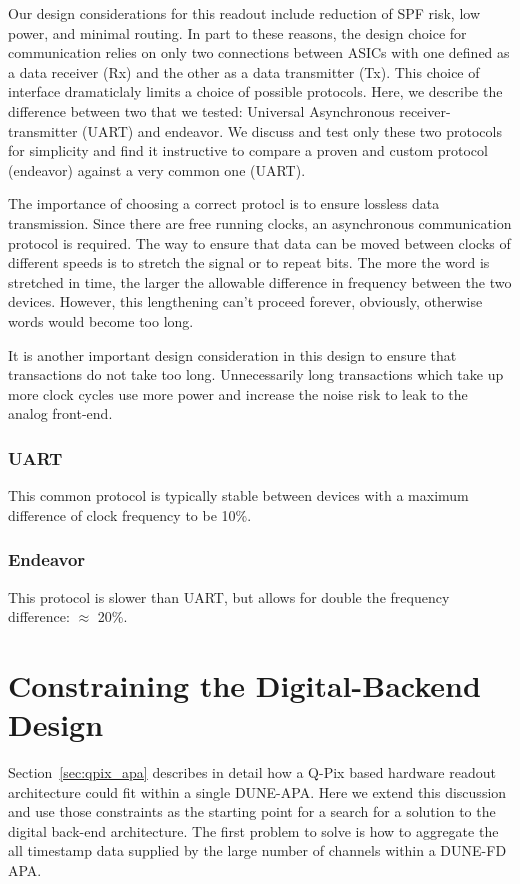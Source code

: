 Our design considerations for this readout include reduction of SPF risk, low power, and minimal routing.
In part to these reasons, the design choice for communication relies on only two connections between ASICs with one defined as a data receiver (Rx) and the other as a data transmitter (Tx).
This choice of interface dramaticlaly limits a choice of possible protocols.
Here, we describe the difference between two that we tested: Universal Asynchronous receiver-transmitter (UART) and endeavor.
We discuss and test only these two protocols for simplicity and find it instructive to compare a proven and custom protocol (endeavor) against a very common one (UART).

The importance of choosing a correct protocl is to ensure lossless data transmission.
Since there are free running clocks, an asynchronous communication protocol is required.
The way to ensure that data can be moved between clocks of different speeds is to stretch the signal or to repeat bits.
The more the word is stretched in time, the larger the allowable difference in frequency between the two devices.
However, this lengthening can't proceed forever, obviously, otherwise words would become too long.

It is another important design consideration in this design to ensure that transactions do not take too long.
Unnecessarily long transactions which take up more clock cycles use more power and increase the noise risk to leak to the analog front-end.


\subsubsection{UART}
This common protocol is typically stable between devices with a maximum difference of clock frequency to be 10\%.

\subsubsection{Endeavor}
This protocol is slower than UART, but allows for double the frequency difference: $\approx$ 20\%.

\section{Constraining the Digital-Backend Design}

Section~\ref{sec:qpix_apa} describes in detail how a Q-Pix based hardware readout architecture could fit within a single DUNE-APA.
Here we extend this discussion and use those constraints as the starting point for a search for a solution to the digital back-end architecture.
The first problem to solve is how to aggregate the all timestamp data supplied by the large number of channels within a DUNE-FD APA.


